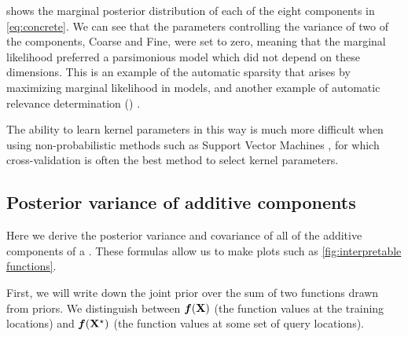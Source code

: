  shows the marginal posterior distribution of each of the eight components in \cref{eq:concrete}.
We can see that the parameters controlling the variance of two of the components, Coarse and Fine, were set to zero, meaning that the marginal likelihood preferred a parsimonious model which did not depend on these dimensions.
This is an example of the automatic sparsity that arises by maximizing marginal likelihood in \gp{} models, and another example of automatic relevance determination (\ARD) \citep{neal1995bayesian}.

The ability to learn kernel parameters in this way is much more difficult when using non-probabilistic methods such as Support Vector Machines \citep{cortes1995support}, for which cross-validation is often the best method to select kernel parameters.



\subsection{Posterior variance of additive components}
\label{sec:posterior-variance}


Here we derive the posterior variance and covariance of all of the additive components of a \gp{}.
These formulas allow us to make plots such as \cref{fig:interpretable functions}.

First, we will write down the joint prior over the sum of two functions drawn from \gp{} priors.
We distinguish between $\boldsymbol{f}(\mathbf{X})$ (the function values at the training locations) and  $\boldsymbol{f}(\mathbf{X}^\star)$ (the function values at some set of query locations).

